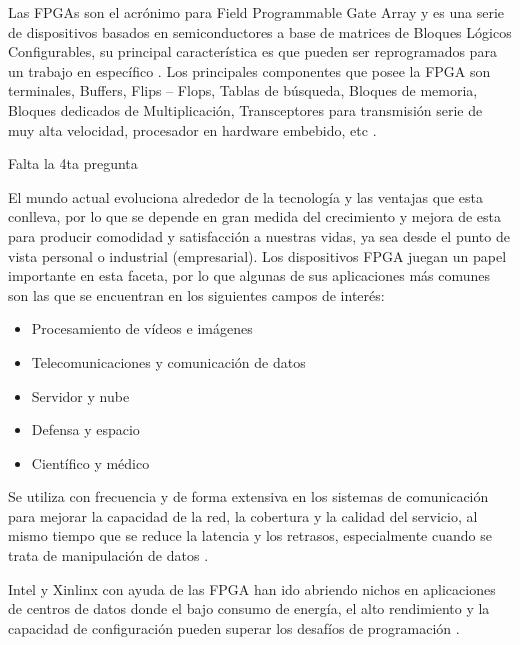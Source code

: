 \documentclass[journal]{IEEEtran}
\begin{document}
	\vspace{4mm}
	
	Las FPGAs son el acrónimo para Field Programmable Gate Array y es una serie de dispositivos basados en semiconductores a base de matrices de Bloques Lógicos Configurables, su principal característica es que pueden ser reprogramados para un trabajo en específico \cite{Lopez2020}. Los principales componentes que posee la FPGA son terminales, Buffers, Flips – Flops, Tablas de búsqueda, Bloques de memoria, Bloques dedicados de Multiplicación, Transceptores para transmisión serie de muy alta velocidad, procesador en hardware embebido, etc \cite{Sisterna}.
	
	\vspace{4mm}
	
	Falta la 4ta pregunta
	
	\vspace{4mm}
	
	El mundo actual evoluciona alrededor de la tecnología y las ventajas que esta conlleva, por lo que se depende en gran medida del crecimiento y mejora de esta para producir comodidad y satisfacción a nuestras vidas, ya sea desde el punto de vista personal o industrial (empresarial). Los dispositivos FPGA juegan un papel importante en esta faceta, por lo que algunas de sus aplicaciones más comunes son las que se encuentran en los siguientes campos de interés:
	
	\begin{itemize}
		\item Procesamiento de vídeos e imágenes
		\item Telecomunicaciones y comunicación de datos
		\item Servidor y nube 
		\item Defensa y espacio
		\item Científico y médico
	\end{itemize}

	Se utiliza con frecuencia y de forma extensiva en los sistemas de comunicación para mejorar la capacidad de la red, la cobertura y la calidad del servicio, al mismo tiempo que se reduce la latencia y los retrasos, especialmente cuando se trata de manipulación de datos \cite{HardwareBee}. 
	
	Intel y Xinlinx con ayuda de las FPGA han ido abriendo nichos en aplicaciones de centros de datos donde el bajo consumo de energía, el alto rendimiento y la capacidad de configuración pueden superar los desafíos de programación \cite{Freund2018}.
	
\end{document}
